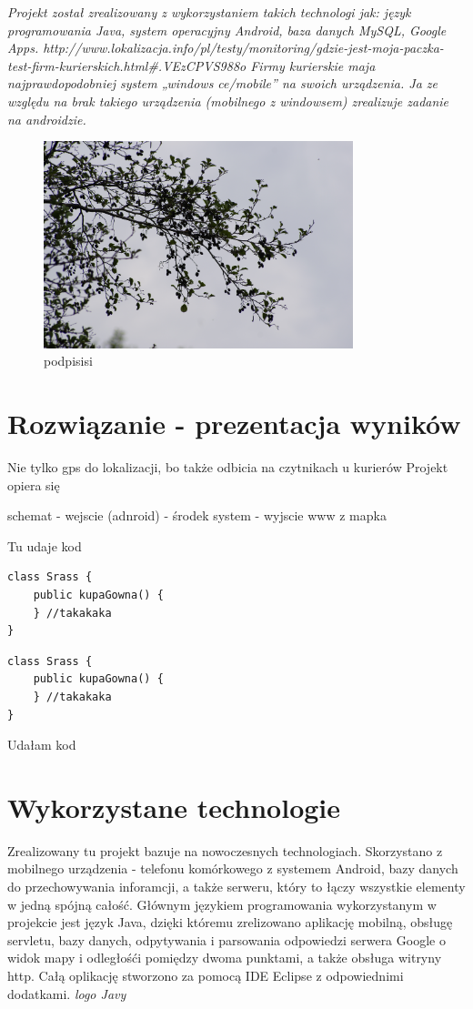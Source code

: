 \documentclass[eng,printmode,oneside]{mgr}
\begin{document}
\emph{\color{komentarz}
Projekt został zrealizowany z wykorzystaniem takich
technologi jak:
język programowania Java, system operacyjny Android, baza danych MySQL, Google Apps.
http://www.lokalizacja.info/pl/testy/monitoring/gdzie-jest-moja-paczka-test-firm-kurierskich.html\#.VEzCPVS988o
Firmy kurierskie maja najprawdopodobniej system „windows ce/mobile” na swoich urządzenia. Ja ze względu na brak takiego urządzenia (mobilnego z windowsem) 
zrealizuje zadanie na androidzie.
}

\begin{figure}[ht!]
\centering
\includegraphics[width=90mm]{obr.jpg}
\caption{podpisisi}
\end{figure}
\chapter{Rozwiązanie - prezentacja wyników}


Nie tylko gps do lokalizacji, bo także odbicia na czytnikach u kurierów 
Projekt opiera się 

schemat - wejscie (adnroid) - środek system - wyjscie www z mapka

Tu udaje kod
\lstset{style=listJava}
\begin{lstlisting}[caption={to jest podpis}]
class Srass {
	public kupaGowna() {
	} //takakaka
}
\end{lstlisting}
\lstset{style=listPython}
\begin{lstlisting}[caption={to jest podpis drugiego}]
class Srass {
	public kupaGowna() {
	} //takakaka
}
\end{lstlisting}

Udałam kod
\chapter{Wykorzystane technologie}

Zrealizowany tu projekt bazuje na nowoczesnych technologiach.
Skorzystano z mobilnego urządzenia - telefonu komórkowego z systemem
Android, bazy danych do przechowywania inforamcji, a także serweru, który to
łączy wszystkie elementy w jedną spójną całość. Głównym językiem
programowania wykorzystanym w projekcie jest język Java, dzięki któremu
zrelizowano aplikację mobilną, obsługę servletu, bazy danych, odpytywania i
parsowania odpowiedzi serwera Google o widok mapy i odległośći pomiędzy dwoma
punktami, a także obsługa witryny http. Całą oplikację stworzono za pomocą IDE
Eclipse z odpowiednimi dodatkami.
\emph{\color{komentarz}logo Javy}
\end{document}
